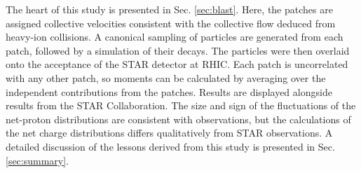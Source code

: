 The heart of this study is presented in Sec. \ref{sec:blast}. Here, the patches are assigned collective velocities consistent with the collective flow deduced from heavy-ion collisions. A canonical sampling of particles are generated from each patch, followed by a simulation of their decays. The particles were then overlaid onto the acceptance of the STAR detector at RHIC. Each patch is uncorrelated with any other patch, so moments can be calculated by averaging over the independent contributions from the patches. Results are displayed alongside results from the STAR Collaboration. The size and sign of the fluctuations of the net-proton distributions are consistent with observations, but the calculations of the net charge distributions differs qualitatively from STAR observations. A detailed discussion of the lessons derived from this study is presented in Sec. \ref{sec:summary}.
